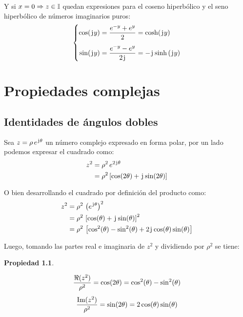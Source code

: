 \documentclass[a5paper,12pt,twoside]{book}
\newtheorem{prop}{{Propiedad}}[chapter]
\begin{document}
Y si $x=0 \Rightarrow z \in \mathbb{I}$ quedan expresiones para el coseno hiperbólico y el seno hiperbólico de números imaginarios puros:
\begin{equation*}
    \left\{
    \begin{aligned}
        \cos(\mkern2mu\mathrm{j}\mkern1mu y) &= \frac{e^{-y} + e^y}{2} = \cosh(\mkern2mu\mathrm{j}\mkern1mu y)
        \\[1ex]
        \sin(\mkern2mu\mathrm{j}\mkern1mu y) &= \frac{e^{-y} - e^y}{2\mkern2mu\mathrm{j}\mkern1mu} = -\mkern2mu\mathrm{j}\mkern1mu \sinh{(\mkern2mu\mathrm{j}\mkern1muy)}
    \end{aligned}
    \right.
\end{equation*}


\chapter{Propiedades complejas}


\section{Identidades de ángulos dobles}

Sea $z=\rho \, e^{\mkern2mu\mathrm{j}\mkern1mu \theta}$ un número complejo expresado en forma polar, por un lado podemos expresar el cuadrado como:
\begin{align*}
    z^2 &= \rho^2 \, e^{2 \mkern2mu\mathrm{j}\mkern1mu \theta}
    \\
    &= \rho^2 \left[ \cos(2 \theta) + \mkern2mu\mathrm{j}\mkern1mu \sin(2 \theta) \right]
\end{align*}

O bien desarrollando el cuadrado por definición del producto como:
\begin{align*}
    z^2 &= \rho^2 \, \left(e^{\mkern2mu\mathrm{j}\mkern1mu \theta}\right)^2
    \\
    &= \rho^2 \, \left[ \cos(\theta) + \mkern2mu\mathrm{j}\mkern1mu \sin(\theta) \right]^2
    \\
    &= \rho^2 \, \left[ \cos^2(\theta) - \sin^2(\theta) + 2\mkern2mu\mathrm{j}\mkern1mu \cos(\theta) \sin(\theta) \right]
\end{align*}

Luego, tomando las partes real e imaginaria de $z^2$ y dividiendo por $\rho^2$ se tiene:

\begin{mdframed}[style=PropertyFrame]
    \begin{prop}
    \end{prop}
    \begin{gather*}
        \frac{\Re (z^2)}{\rho^2} = \cos(2 \theta) = \cos^2(\theta) - \sin^2(\theta)
        \\[1ex]
        \frac{\operatorname{Im} (z^2)}{\rho^2} = \sin(2 \theta) = 2\cos(\theta) \sin(\theta)
    \end{gather*}
\end{mdframed}
\end{document}
